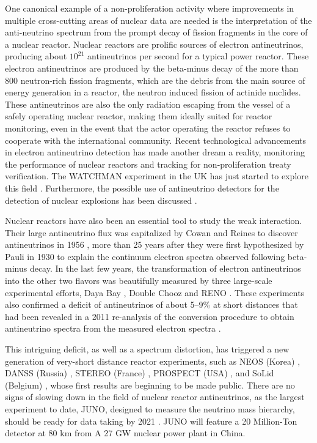 \documentclass[letterpaper]{ar-1col}
\begin{document}
One canonical example of a non-proliferation activity where improvements in multiple cross-cutting areas of nuclear data are needed is the interpretation of the anti-neutrino spectrum from the prompt decay of fission fragments in the core of a nuclear reactor.
Nuclear reactors are prolific sources of electron antineutrinos, producing about $10^{21}$ antineutrinos per second for a typical power reactor.
 These electron antineutrinos are produced by the beta-minus decay of the more than 800 neutron-rich fission fragments, which are the debris from the main source of energy generation in a reactor, the neutron induced fission of actinide nuclides.
 These antineutrinos are also the only radiation escaping from the vessel of a safely operating nuclear reactor, making them ideally suited for reactor monitoring, even in the event that the actor operating the reactor refuses to cooperate with the international community.
 Recent technological advancements in electron antineutrino detection has made another dream a reality, monitoring the performance of nuclear reactors and tracking  for non-proliferation treaty verification.
  The WATCHMAN experiment in the UK has just started to explore this field \cite{Cha18}.
 Furthermore, the possible use of antineutrino detectors for the detection of nuclear explosions has been discussed \cite{CarAx}.
 
Nuclear reactors have also been an essential tool to study the weak interaction.
 Their large antineutrino flux was capitalized by Cowan and Reines to discover antineutrinos in 1956 \cite{Cow56}, more than 25 years after they were first hypothesized by Pauli in 1930 to explain the continuum electron spectra observed following beta-minus decay.
  In the last few years, the transformation of electron antineutrinos into the other two flavors was beautifully measured by three large-scale experimental efforts, Daya Bay \cite{An16}, Double Chooz \cite{Abe12} and RENO \cite{Cho16}.
  These experiments also confirmed a deficit of antineutrinos of about 5--9\% at short distances that had been revealed in a 2011 re-analysis of the conversion procedure to obtain antineutrino spectra from the measured electron spectra \cite{Men11}.

This intriguing deficit, as well as a spectrum distortion, has triggered a new generation of very-short distance reactor experiments, such as NEOS (Korea) \cite{Ko17}, DANSS (Russia) \cite{AleAx}, STEREO (France) \cite{AllAx}, PROSPECT (USA) \cite{Ash16}, and SoLid (Belgium) \cite{Kal17}, whose first results are beginning to be made public.
 There are no signs of slowing down in the field of nuclear reactor antineutrinos, as the largest experiment to date, JUNO, designed to measure the neutrino mass hierarchy, should be ready for data taking by 2021 \cite{SalAx}.
 JUNO will feature a 20 Million-Ton detector at 80 km from A 27 GW nuclear power plant in China.
\end{document}
